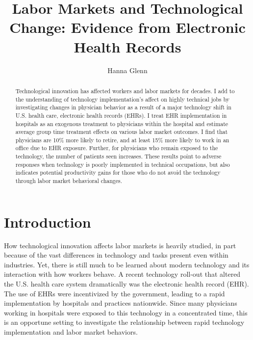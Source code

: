 \documentclass[12pt]{article}
\title{Labor Markets and Technological Change: Evidence from Electronic Health Records}
\author{Hanna Glenn}
\begin{document}
\maketitle

\begin{abstract}
    Technological innovation has affected workers and labor markets for decades. I add to the understanding of technology implementation's affect on highly technical jobs by investigating changes in physician behavior as a result of a major technology shift in U.S. health care, electronic health records (EHRs). I treat EHR implementation in hospitals as an exogenous treatment to physicians within the hospital and estimate average group time treatment effects on various labor market outcomes. I find that physicians are 10\% more likely to retire, and at least 15\% more likely to work in an office due to EHR exposure. Further, for physicians who remain exposed to the technology, the number of patients seen increases. These results point to adverse responses when technology is poorly implemented in technical occupations, but also indicates potential productivity gains for those who do not avoid the technology through labor market behavioral changes. 
\end{abstract}

\vspace{1.5cm}

\section{Introduction}
How technological innovation affects labor markets is heavily studied, in part because of the vast differences in technology and tasks present even within industries. Yet, there is still much to be learned about modern technology and its interaction with how workers behave. A recent technology roll-out that altered the U.S. health care system dramatically was the electronic health record (EHR). The use of EHRs were incentivized by the government, leading to a rapid implementation by hospitals and practices nationwide. Since many physicians working in hospitals were exposed to this technology in a concentrated time, this is an opportune setting to investigate the relationship between rapid technology implementation and labor market behaviors. 
\end{document}
